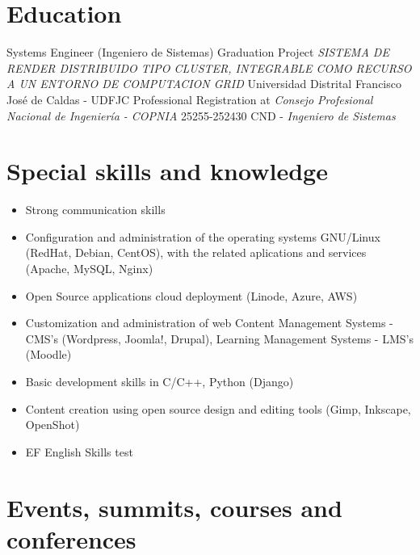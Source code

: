 \documentclass[overlapped,line,final]{res}
\begin{document}
\begin{resume}
\section{\sc Education}
\vspace{0.5cm}
Systems Engineer (Ingeniero de Sistemas)
\newline Graduation Project \textit{SISTEMA DE RENDER DISTRIBUIDO TIPO CLUSTER, INTEGRABLE COMO RECURSO A UN ENTORNO DE COMPUTACION GRID}
\newline Universidad Distrital Francisco José de Caldas - UDFJC
\newline Professional Registration at \textit{Consejo Profesional Nacional de Ingeniería - COPNIA} 25255-252430 CND - \textit{Ingeniero de Sistemas}
\vspace{0.25cm}

\section{\sc Special skills and knowledge}
\vspace{0.5cm}
\begin{itemize}
	\item Strong communication skills 
	\item Configuration and administration of the operating systems GNU/Linux (RedHat, Debian, CentOS), with the related aplications and services (Apache, MySQL, Nginx)
	\item Open Source applications cloud deployment (Linode, Azure, AWS) 
	\item Customization and administration of web Content Management Systems - CMS's (Wordpress, Joomla!, Drupal), Learning Management Systems - LMS's (Moodle)
	\item Basic development skills in C/C++, Python (Django)
 	\item Content creation using open source design and editing tools (Gimp, Inkscape, OpenShot)
	\item EF English Skills test \href{https://raw.githubusercontent.com/Open-SAI/NemqCV/master/latex/docs/efTest2021.pdf}{}
\end{itemize}

\section{\sc Events, summits, courses and conferences}
\vspace{0.5cm}
\begin{itemize}


\end{itemize}
\end{resume}
\end{document}
